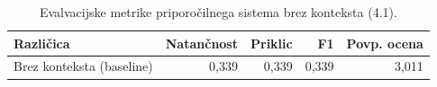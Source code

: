 \begin{table}[h]
\centering
\caption{Evalvacijske metrike priporočilnega sistema brez konteksta (4.1).}
\label{tab:evaluation_metrics_4_1}
\begin{tabular}{lrrrr}
\toprule
Različica & Natančnost & Priklic & F1 & Povp. ocena \\
\midrule
Brez konteksta (baseline) & 0,339 & 0,339 & 0,339 & 3,011 \\
\bottomrule
\end{tabular}

\end{table}
